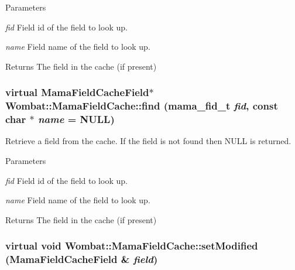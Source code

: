 \begin{DoxyParams}{Parameters}
\item[{\em fid}]Field id of the field to look up. \item[{\em name}]Field name of the field to look up. \end{DoxyParams}
\begin{DoxyReturn}{Returns}
The field in the cache (if present) 
\end{DoxyReturn}
\hypertarget{classWombat_1_1MamaFieldCache_a7fd0b10e6ba432be77cb2b0e4623831e}{
\subsubsection[{find}]{\setlength{\rightskip}{0pt plus 5cm}virtual {\bf MamaFieldCacheField}$\ast$ Wombat::MamaFieldCache::find (mama\_\-fid\_\-t {\em fid}, \/  const char $\ast$ {\em name} = {\ttfamily NULL})}}
\label{classWombat_1_1MamaFieldCache_a7fd0b10e6ba432be77cb2b0e4623831e}


Retrieve a field from the cache. If the field is not found then NULL is returned.


\begin{DoxyParams}{Parameters}
\item[{\em fid}]Field id of the field to look up. \item[{\em name}]Field name of the field to look up. \end{DoxyParams}
\begin{DoxyReturn}{Returns}
The field in the cache (if present) 
\end{DoxyReturn}
\hypertarget{classWombat_1_1MamaFieldCache_a39d894aad55e8fc21cd00f766d9a4b48}{
\subsubsection[{setModified}]{\setlength{\rightskip}{0pt plus 5cm}virtual void Wombat::MamaFieldCache::setModified ({\bf MamaFieldCacheField} \& {\em field})}}
\label{classWombat_1_1MamaFieldCache_a39d894aad55e8fc21cd00f766d9a4b48}


